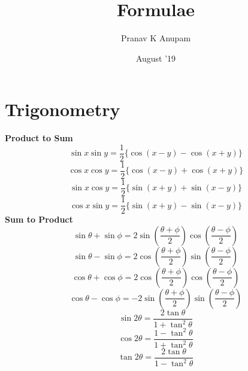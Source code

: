 \documentclass[a4paper,10pt]{article}
\title{Formulae}
\author{Pranav K Anupam}
\date{August '19}
\begin{document}
\maketitle
\section{Trigonometry}
\textbf{Product to Sum}\\
$$\sin x\sin y= \frac{1}{2}\{\cos(x-y)-\cos(x+y)\}$$
$$\cos x\cos y=\frac{1}{2}\{\cos(x-y)+\cos(x+y)\}$$
$$\sin x\cos y=\frac{1}{2}\{\sin(x+y)+\sin(x-y)\}$$
$$\cos x\sin y=\frac{1}{2}\{\sin(x+y)-\sin(x-y)\}$$
\textbf{Sum to Product}\\
$$\sin\theta+\sin\phi=2\sin(\frac{\theta+\phi}{2})\cos(\frac{\theta-\phi}{2})$$
$$\sin\theta-\sin\phi=2\cos(\frac{\theta+\phi}{2})\sin(\frac{\theta-\phi}{2})$$
$$\cos\theta+\cos\phi=2\cos(\frac{\theta+\phi}{2})\cos(\frac{\theta-\phi}{2})$$
$$\cos\theta-\cos\phi=-2\sin(\frac{\theta+\phi}{2})\sin(\frac{\theta-\phi}{2})$$
$$\sin 2\theta=\frac{2\tan\theta}{1+\tan^2\theta}$$
$$\cos 2\theta=\frac{1-\tan^2\theta}{1+\tan^2\theta}$$
$$\tan 2\theta=\frac{2\tan\theta}{1-\tan^2\theta}$$
\end{document}
